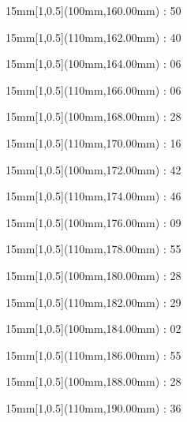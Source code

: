 \documentclass[a5paper]{memoir}
\begin{document}
\begin{textblock*}{15mm}[1,0.5](100mm,160.00mm) : 50\gridstrut\end{textblock*}
\begin{textblock*}{15mm}[1,0.5](110mm,162.00mm) : 40\gridstrut\end{textblock*}
\begin{textblock*}{15mm}[1,0.5](100mm,164.00mm) : 06\gridstrut\end{textblock*}
\begin{textblock*}{15mm}[1,0.5](110mm,166.00mm) : 06\gridstrut\end{textblock*}
\begin{textblock*}{15mm}[1,0.5](100mm,168.00mm) : 28\gridstrut\end{textblock*}
\begin{textblock*}{15mm}[1,0.5](110mm,170.00mm) : 16\gridstrut\end{textblock*}
\begin{textblock*}{15mm}[1,0.5](100mm,172.00mm) : 42\gridstrut\end{textblock*}
\begin{textblock*}{15mm}[1,0.5](110mm,174.00mm) : 46\gridstrut\end{textblock*}
\begin{textblock*}{15mm}[1,0.5](100mm,176.00mm) : 09\gridstrut\end{textblock*}
\begin{textblock*}{15mm}[1,0.5](110mm,178.00mm) : 55\gridstrut\end{textblock*}
\begin{textblock*}{15mm}[1,0.5](100mm,180.00mm) : 28\gridstrut\end{textblock*}
\begin{textblock*}{15mm}[1,0.5](110mm,182.00mm) : 29\gridstrut\end{textblock*}
\begin{textblock*}{15mm}[1,0.5](100mm,184.00mm) : 02\gridstrut\end{textblock*}
\begin{textblock*}{15mm}[1,0.5](110mm,186.00mm) : 55\gridstrut\end{textblock*}
\begin{textblock*}{15mm}[1,0.5](100mm,188.00mm) : 28\gridstrut\end{textblock*}
\begin{textblock*}{15mm}[1,0.5](110mm,190.00mm) : 36\gridstrut\end{textblock*}
\end{document}
